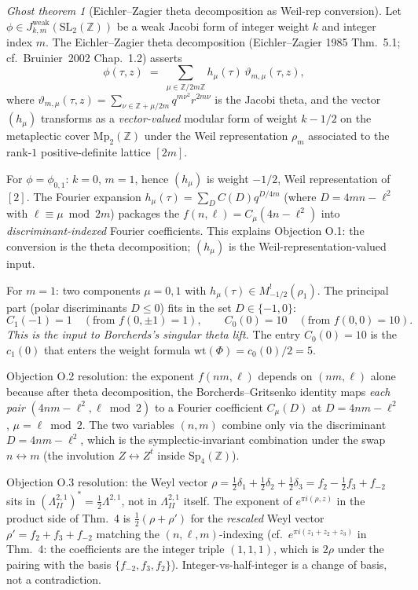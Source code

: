 \documentclass[11pt]{article}
\theoremstyle{definition}
\theoremstyle{remark}
\newtheorem{ghost}[theorem]{Ghost theorem}
\newcommand{\ZZ}{\mathbb{Z}}
\newcommand{\Lat}{\Lambda}
\newcommand{\Sp}{\mathrm{Sp}}
\newcommand{\SL}{\mathrm{SL}}
\begin{document}
\begin{ghost}[Eichler--Zagier theta decomposition as Weil-rep conversion]
\label{ghost:cycle1}
Let $\phi\in J^{\mathrm{weak}}_{k,m}(\SL_2(\ZZ))$ be a weak Jacobi form
of integer weight $k$ and integer index $m$. The Eichler--Zagier
theta decomposition (Eichler--Zagier 1985 Thm.~5.1; cf.\
Bruinier~2002 Chap.~1.2) asserts
\begin{equation}
\label{eq:theta-decomp}
  \phi(\tau,z)\;=\;\sum_{\mu\in\ZZ/2m\ZZ}h_\mu(\tau)\,
  \vartheta_{m,\mu}(\tau,z),
\end{equation}
where $\vartheta_{m,\mu}(\tau,z)=\sum_{\nu\in\ZZ+\mu/2m}q^{m\nu^2}r^{2m\nu}$
is the Jacobi theta, and the vector $(h_\mu)$ transforms as a
\emph{vector-valued} modular form of weight $k-1/2$ on the metaplectic
cover $\mathrm{Mp}_2(\ZZ)$ under the Weil representation
$\rho_m$ associated to the rank-$1$ positive-definite lattice $[2m]$.

For $\phi=\phi_{0,1}$: $k=0$, $m=1$, hence $(h_\mu)$ is weight $-1/2$,
Weil representation of $[2]$. The Fourier expansion
$h_\mu(\tau)=\sum_{D}C(D)q^{D/4m}$ (where $D=4mn-\ell^2$ with
$\ell\equiv\mu\bmod 2m$) packages the $f(n,\ell)=C_\mu(4n-\ell^2)$
into \emph{discriminant-indexed} Fourier coefficients. This explains
Objection O.1: the conversion is the theta decomposition; $(h_\mu)$ is
the Weil-representation-valued input.

For $m=1$: two components $\mu=0,1$ with $h_\mu(\tau)\in M^!_{-1/2}
(\rho_1)$. The principal part (polar discriminants $D\leq 0$) fits in
the set $D\in\{-1,0\}$:
\[
  C_1(-1)=1\quad(\text{from }f(0,\pm 1)=1),\qquad
  C_0(0)=10\quad(\text{from }f(0,0)=10).
\]
\emph{This is the input to Borcherds's singular theta lift.} The entry
$C_0(0)=10$ is the $c_1(0)$ that enters the weight formula
$\mathrm{wt}(\Phi)=c_0(0)/2=5$.

Objection O.2 resolution: the exponent $f(nm,\ell)$ depends on
$(nm,\ell)$ alone because after theta decomposition, the
Borcherds--Gritsenko identity maps \emph{each pair} $(4nm-\ell^2,
\ell\bmod 2)$ to a Fourier coefficient $C_\mu(D)$ at $D=4nm-\ell^2$,
$\mu=\ell\bmod 2$. The two variables $(n,m)$ combine only via the
discriminant $D=4nm-\ell^2$, which is the symplectic-invariant
combination under the swap $n\leftrightarrow m$
(the involution $Z\leftrightarrow Z^t$ inside $\Sp_4(\ZZ)$).

Objection O.3 resolution: the Weyl vector $\rho=\tfrac12\delta_1+
\tfrac12\delta_2+\tfrac12\delta_3=f_2-\tfrac12f_3+f_{-2}$ sits in
$(\Lat^{2,1}_{II})^*=\tfrac12\Lat^{2,1}$, not in $\Lat^{2,1}_{II}$
itself. The exponent of $e^{\pi i(\rho,z)}$ in the product side of
Thm.~4 is $\tfrac12(\rho+\rho')$ for the \emph{rescaled} Weyl vector
$\rho'=f_2+f_3+f_{-2}$ matching the $(n,\ell,m)$-indexing
(cf.\ $e^{\pi i(z_1+z_2+z_3)}$ in Thm.~4: the coefficients are the
integer triple $(1,1,1)$, which is $2\rho$ under the pairing with the
basis $\{f_{-2},f_3,f_2\}$). Integer-vs-half-integer is a change of
basis, not a contradiction.


\end{ghost}
\end{document}

